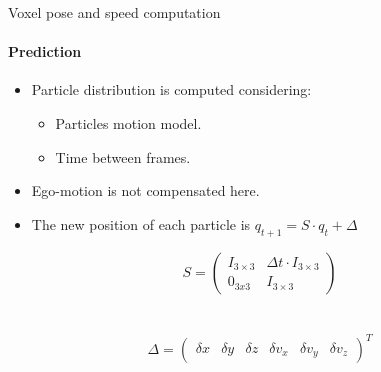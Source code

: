 \begin{frame}{Voxel pose and speed computation}
  \framesubtitle{Prediction}
  \begin{itemize}
   \item Particle distribution is computed considering:
   \begin{itemize}
    \item Particles motion model.
    \item Time between frames.
   \end{itemize}
   \item Ego-motion is not compensated here.
   \item The new position of each particle is $q_{t + 1} = S \cdot q_{t} + \Delta$
   
  \end{itemize}
  
  \begin{block}{}
    \footnotesize
    \begin{equation}
      \nonumber
      S =
      \left( \begin{array}{cc}
      I_{3\times3} & \Delta t \cdot I_{3\times3} \\
      0_{3x3} & I_{3\times3} \end{array} \right)
    \end{equation}
    \\~\\
    \begin{equation}
      \nonumber
      \Delta =
      \left( \begin{array}{cccccc}
      \delta x & \delta y & \delta z & \delta v_x & \delta v_y & \delta v_z
      \end{array} \right)^T
    \end{equation}
  \end{block}
\end{frame}

